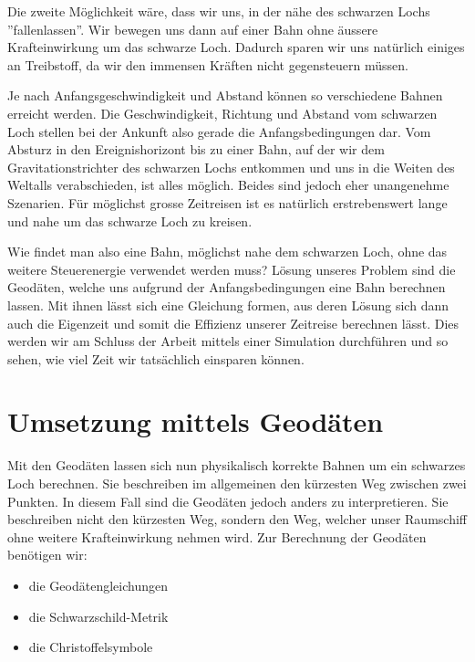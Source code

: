 \begin{refsection}
	Die zweite Möglichkeit wäre, dass wir uns, in der nähe des schwarzen Lochs ''fallenlassen''. Wir bewegen uns dann auf einer Bahn ohne äussere Krafteinwirkung um das schwarze Loch. Dadurch sparen wir uns natürlich einiges an Treibstoff, da wir den immensen Kräften nicht gegensteuern müssen. 
    
    Je nach Anfangsgeschwindigkeit und Abstand können so verschiedene Bahnen erreicht werden. Die Geschwindigkeit, Richtung und Abstand vom schwarzen Loch stellen bei der Ankunft also gerade die Anfangsbedingungen dar. Vom Absturz in den Ereignishorizont bis zu einer Bahn, auf der wir dem Gravitationstrichter des schwarzen Lochs entkommen und uns in die Weiten des Weltalls verabschieden, ist alles möglich. Beides sind jedoch eher unangenehme Szenarien. Für möglichst grosse Zeitreisen ist es natürlich erstrebenswert lange und nahe um das schwarze Loch zu kreisen.
	
	Wie findet man also eine Bahn, möglichst nahe dem schwarzen Loch, ohne das weitere Steuerenergie verwendet werden muss?
	Lösung unseres Problem sind die Geodäten, welche uns aufgrund der Anfangsbedingungen eine Bahn berechnen lassen. Mit ihnen lässt sich eine Gleichung formen, aus deren Lösung sich dann auch die Eigenzeit und somit die Effizienz unserer Zeitreise berechnen lässt. Dies werden wir am Schluss der Arbeit mittels einer Simulation durchführen und so sehen, wie viel Zeit wir tatsächlich einsparen können.
	
	\section{Umsetzung mittels Geodäten}
	Mit den Geodäten lassen sich nun physikalisch korrekte Bahnen um ein schwarzes Loch berechnen. Sie beschreiben im allgemeinen den kürzesten Weg zwischen zwei Punkten. In diesem Fall sind die Geodäten jedoch anders zu interpretieren. Sie beschreiben nicht den kürzesten Weg, sondern den Weg, welcher unser Raumschiff ohne weitere Krafteinwirkung nehmen wird.
	Zur Berechnung der Geodäten benötigen wir:
	\begin{itemize}
		\item die Geodätengleichungen
		\item die Schwarzschild-Metrik
		\item die Christoffelsymbole
	\end{itemize}


\end{refsection}
